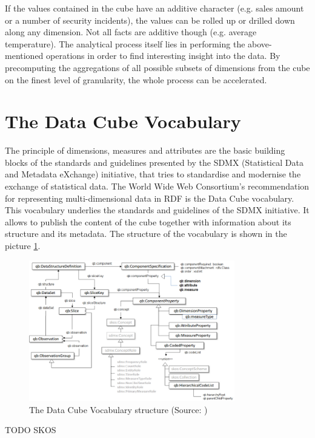 If the values contained in the cube have an additive character (e.g. sales amount or a number of security incidents), the values can be rolled up or drilled down along any dimension. Not all facts are additive though (e.g. average temperature). The analytical process itself lies in performing the above-mentioned operations in order to find interesting insight into the data. By precomputing the aggregations of all possible subsets of dimensions from the cube on the finest level of granularity, the whole process can be accelerated.

\section{The Data Cube Vocabulary}

The principle of dimensions, measures and attributes are the basic building blocks of the standards and guidelines presented by the SDMX (Statistical Data and Metadata eXchange) initiative, that tries to standardise and modernise the exchange of statistical data. The World Wide Web Consortium's recommendation for representing multi-dimensional data in RDF is the Data Cube vocabulary. This vocabulary underlies the standards and guidelines of the SDMX initiative. It allows to publish the content of the cube together with information about its structure and its metadata. The structure of the vocabulary is shown in the picture \ref{qbstructureimg}.

\begin{figure}[h]
\centering
\includegraphics[width=0.8\textwidth]{img/qbstructure.png}
\caption{The Data Cube Vocabulary structure (Source: \cite{Cyganiak:14:TRD})}
\label{qbstructureimg}
\end{figure}

TODO SKOS


